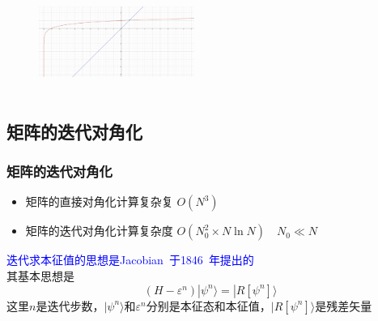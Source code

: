 {\begin{minipage}[b]{0.35\textwidth}
\end{minipage}
\hfill
\begin{minipage}[b]{0.62\textwidth}
\begin{figure}[h!]
	\vspace{-0.21in}
\centering
\includegraphics[height=1.3in,width=2.0in,viewport=0 0 2500 1600,clip]{Figures/solve_lg10.png}
\label{solution-log_10}
\end{figure}
\end{minipage}
}

\subsection{矩阵的迭代对角化}
\frame
{
	\frametitle{矩阵的迭代对角化}
	\begin{itemize}
		\item 矩阵的直接对角化计算复杂复 $O(N^3)$
		\item 矩阵的迭代对角化计算复杂度 $O(N_0^2\times N\ln N)\quad N_0\ll N$
	\end{itemize}
	\textcolor{blue}{迭代求本征值的思想是\textrm{Jacobian~}于\textrm{1846~}年提出的}\\
	其基本思想是
	\begin{displaymath}
		(H-\varepsilon^n)|\psi^n\rangle=|R[\psi^n]\rangle
	\end{displaymath}
	这里$n$是迭代步数，$|\psi^n\rangle$和$\varepsilon^n$分别是本征态和本征值，$|R[\psi^n]\rangle$是残差矢量
	\vskip 10pt
	{\fontsize{7.2pt}{1.2pt}}
}

